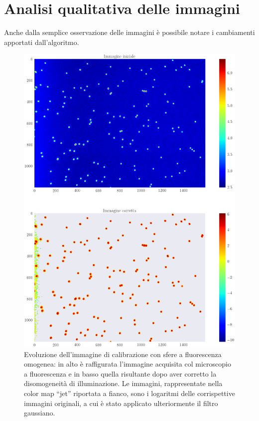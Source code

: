 \clearpage{\pagestyle{empty}\cleardoublepage}
\chapter{Analisi qualitativa delle immagini} 

Anche dalla semplice osservazione delle immagini è possibile notare i cambiamenti apportati dall'algoritmo.

\begin{figure}
 \centering
 \includegraphics[scale=.40]{img/CAP4lg1.png}
 \caption{\small{Evoluzione dell'immagine di calibrazione con sfere a fluorescenza omogenea: in alto è raffigurata l'immagine acquisita col microscopio a fluorescenza e in basso quella risultante dopo aver corretto la disomogeneità di illuminazione. Le immagini, rappresentate nella color map ``jet'' riportata a fianco, sono i logaritmi delle corrispettive immagini originali, a cui è stato applicato ulteriormente il filtro gaussiano.}}
 \label{fig:lg1}
\end{figure}


